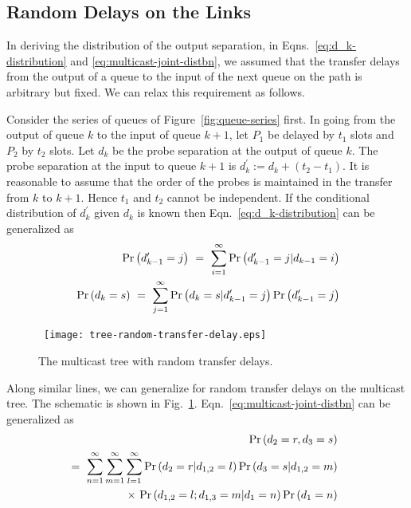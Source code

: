 \documentclass[11pt]{article}
\newcommand{\prob}[1]{\mathsf{\Pr}\left(#1\right)}
\begin{document}
\subsection{Random Delays on the Links}
\label{sec:random-link-delays}
In deriving the distribution of the output separation, in
Eqns.~\ref{eq:d_k-distribution} and \ref{eq:multicast-joint-distbn},
we assumed that the transfer delays from the output of a queue to the
input of the next queue on the path is arbitrary but fixed. We can
relax this requirement as follows.

Consider the series of queues of Figure~\ref{fig:queue-series} first.
In going from the output of queue $k$ to the input of queue $k+1$, let
$P_1$ be delayed by $t_1$ slots and $P_2$ by $t_2$ slots. Let $d_k$ be
the probe separation at the output of queue $k.$ The probe separation
at the input to queue $k+1$ is $d^\prime_k := d_k + (t_2 - t_1).$ It
is reasonable to assume that the order of the probes is maintained in
the transfer from $k$ to $k+1$. Hence $t_1$ and $t_2$ cannot be
independent. If the conditional distribution of $d_k^\prime$ given
$d_k$ is known then Eqn.~\ref{eq:d_k-distribution} can be generalized
as 
\begin{eqnarray*}
  && \prob{d^\prime_{k-1} =j} \ = \ \sum_{i=1}^\infty
  \prob{d_{k-1}^\prime=j 
    | d_{k-1} =i} \\
  && \hspace{-0.1in}
   \prob{d_k=s} \ = \ \sum_{j=1}^\infty \prob{d_k=s | d^\prime_{k-1}
     =j} \prob{d_{k-1}^\prime=j}  
\end{eqnarray*}


\begin{figure}
  \begin{center}
    \
    \texttt{[image: tree-random-transfer-delay.eps]}
  \end{center}
  \caption{The multicast tree with random transfer delays. }
  \label{fig:tree-random-transfer-delay}
\end{figure}
Along similar lines, we can generalize for random transfer delays on
the multicast tree. The schematic is shown in
Fig.~\ref{fig:tree-random-transfer-delay}.
Eqn.~\ref{eq:multicast-joint-distbn} can be generalized as
\begin{eqnarray*}
  && \hspace{-0.2in} 
  \prob{d_2=r, d_3=s} \nonumber \\
  &&  \hspace{-0.2in} = \ \sum_{n=1}^\infty \sum_{m=1}^\infty 
  \sum_{l=1}^\infty \prob{d_2=r|d_{1,2}=l} 
  \prob{d_3=s|d_{1,2}=m} \nonumber \\
  && \hspace{0.5in} \times \ \prob{d_{1,2}=l; d_{1,3}=m| d_1=n}
  \prob{d_1=n}  
\end{eqnarray*}
\end{document}
